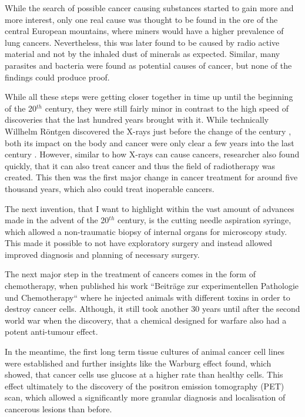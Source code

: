 While the search of possible cancer causing substances started to gain more and more interest, only one real cause was thought to be found in the ore of the central European mountains, where miners would have a higher prevalence of lung cancers. Nevertheless, this was later found to be caused by radio active material and not by the inhaled dust of minerals as expected. Similar, many parasites and bacteria were found as potential causes of cancer, but none of the findings could produce proof.

While all these steps were getting closer together in time up until the beginning of the 20$^{th}$ century, they were still fairly minor in contrast to the high speed of discoveries that the last hundred years brought with it. While technically Willhelm R\"ontgen discovered the X-rays just before the change of the century \cite{Roentgen1898}, both its impact on the body and cancer were only clear a few years into the last century \cite{Frieben1902,Scholtz1902}. However, similar to how X-rays can cause cancers, researcher also found quickly, that it can also treat cancer and thus the field of radiotherapy was created. This then was the first major change in cancer treatment for around five thousand years, which also could treat inoperable cancers.

The next invention, that I want to highlight within the vast amount of advances made in the advent of the 20$^{th}$ century, is the cutting needle aspiration syringe, which allowed a non-traumatic biopsy of internal organs for microscopy study. This made it possible to not have exploratory surgery and instead allowed improved diagnosis and planning of necessary surgery.

The next major step in the treatment of cancers comes in the form of chemotherapy, when \textcite{Ehrlich1909} published his work ``Beitr\"age zur experimentellen Pathologie und Chemotherapy`` where he injected animals with different toxins in order to destroy cancer cells. Although, it still took another 30 years until after the second world war when the discovery, that a chemical designed for warfare also had a potent anti-tumour effect.

In the meantime, the first long term tissue cultures of animal cancer cell lines were established and further insights like the Warburg effect \cite{Warburg1928} found, which showed, that cancer cells use glucose at a higher rate than healthy cells. This effect ultimately to the discovery of the positron emission tomography (PET) scan, which allowed a significantly more granular diagnosis and localisation of cancerous lesions than before.

